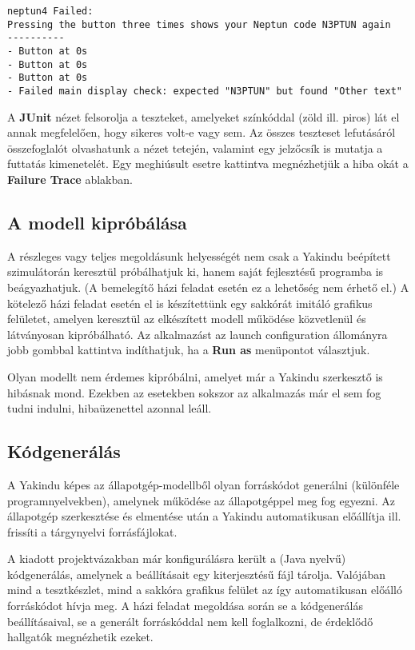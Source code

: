 \begin{lstlisting}
neptun4 Failed:
Pressing the button three times shows your Neptun code N3PTUN again
----------
- Button at 0s
- Button at 0s
- Button at 0s
- Failed main display check: expected "N3PTUN" but found "Other text"
\end{lstlisting}

A \textbf{JUnit} nézet felsorolja a teszteket, amelyeket színkóddal (zöld ill. piros) lát el annak megfelelően, hogy sikeres volt-e vagy sem. Az összes teszteset lefutásáról összefoglalót olvashatunk a nézet tetején, valamint egy jelzőcsík is mutatja a futtatás kimenetelét. Egy meghiúsult esetre kattintva megnézhetjük a hiba okát a \textbf{Failure Trace} ablakban.

\subsection{A modell kipróbálása}

A részleges vagy teljes megoldásunk helyességét nem csak a Yakindu beépített szimulátorán keresztül próbálhatjuk ki, hanem saját fejlesztésű programba is beágyazhatjuk. (A bemelegítő házi feladat esetén ez a lehetőség nem érhető el.) A kötelező házi feladat esetén el is készítettünk egy sakkórát imitáló grafikus felületet, amelyen keresztül az elkészített modell működése közvetlenül és látványosan kipróbálható. Az alkalmazást az  launch configuration állományra jobb gombbal kattintva indíthatjuk, ha a \textbf{Run as} menüpontot választjuk.

\begin{megjegyzes}
	Olyan modellt nem érdemes kipróbálni, amelyet már a Yakindu szerkesztő is hibásnak mond. Ezekben az esetekben sokszor az alkalmazás már el sem fog tudni indulni, hibaüzenettel azonnal leáll.
\end{megjegyzes}

\subsection{Kódgenerálás}

A Yakindu képes az állapotgép-modellből olyan forráskódot generálni (különféle programnyelvekben), amelynek működése az állapotgéppel meg fog egyezni. Az állapotgép szerkesztése és elmentése után a Yakindu automatikusan előállítja ill. frissíti a tárgynyelvi forrásfájlokat.

A kiadott projektvázakban már konfigurálásra került a (Java nyelvű) kódgenerálás, amelynek a beállításait egy  kiterjesztésű fájl tárolja. Valójában mind a tesztkészlet, mind a sakkóra grafikus felület az így automatikusan előálló forráskódot hívja meg. A házi feladat megoldása során se a kódgenerálás beállításaival, se a generált forráskóddal nem kell foglalkozni, de érdeklődő hallgatók megnézhetik ezeket.

